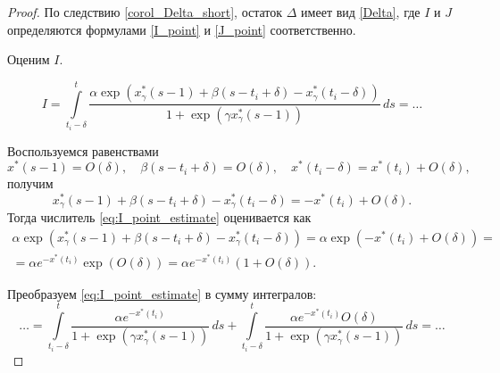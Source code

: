 \begin{proof}
	По следствию \ref{corol_Delta_short}, остаток $\Delta$ имеет вид \eqref{Delta}, где $I$ и $J$ определяются формулами \eqref{I_point} и \eqref{J_point} соответственно.
	
	Оценим $I$.
	
	\begin{equation}
	\label{eq:I_point_estimate}
	I = \int\limits_{t_i - \delta}^{t} \dfrac{\alpha \exp(x^*_{\gamma}(s - 1) + \beta(s - t_i + \delta) - x^*_{\gamma}(t_i - \delta))}{1 + \exp(\gamma x^*_{\gamma}(s - 1))}\, ds = \ldots
	\end{equation}
	
	Воспользуемся равенствами
	\[
	x^*(s - 1) = O(\delta), \quad \beta(s - t_i + \delta) = O(\delta), \quad x^*(t_i - \delta) = x^*(t_i) + O(\delta),
	\]
	получим
	\[
	x^*_{\gamma}(s - 1) + \beta(s - t_i + \delta) - x^*_{\gamma}(t_i - \delta) = -x^*(t_i) + O(\delta).
	\]
	Тогда числитель \eqref{eq:I_point_estimate} оценивается как
	\begin{multline*}
	\alpha \exp(x^*_{\gamma}(s - 1) + \beta(s - t_i + \delta) - x^*_{\gamma}(t_i - \delta)) = \alpha \exp(-x^*(t_i) + O(\delta)) =\\= \alpha e^{-x^*(t_i)} \exp(O(\delta)) = \alpha e^{-x^*(t_i)} (1 + O(\delta)).
	\end{multline*}
	
	Преобразуем \eqref{eq:I_point_estimate} в сумму интегралов:
	\[
	\ldots = \int\limits_{t_i - \delta}^{t} \dfrac{\alpha e^{-x^*(t_i)}}{1 + \exp(\gamma x^*_{\gamma}(s - 1))}\, ds + \int\limits_{t_i - \delta}^{t} \dfrac{\alpha e^{-x^*(t_i)} O(\delta)}{1 + \exp(\gamma x^*_{\gamma}(s - 1))} \, ds = \ldots
	\]
	

\end{proof}
